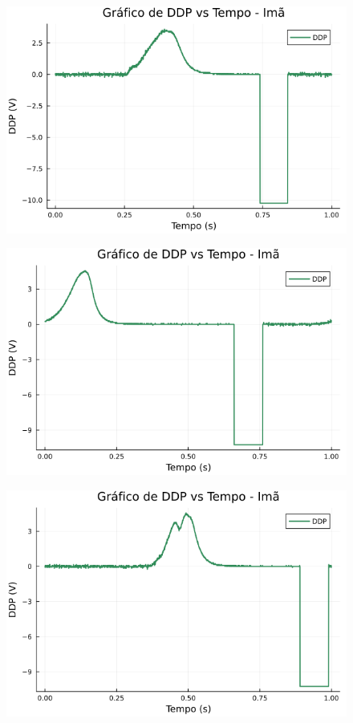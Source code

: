 \begin{center}
\begin{multicols}{2}
\begin{figure}[H]
    \centering
    \includegraphics[width=1.0\linewidth]{figuras/grafico_dados1_F0010CH1.png}
\end{figure}

\begin{figure}[H]
    \centering
    \includegraphics[width=1.0\linewidth]{figuras/grafico_dados1_F0011CH1.png}
\end{figure}

\begin{figure}[H]
    \centering
    \includegraphics[width=1.0\linewidth]{figuras/grafico_dados1_F0012CH1.png}
\end{figure}


\end{multicols}
\end{center}
